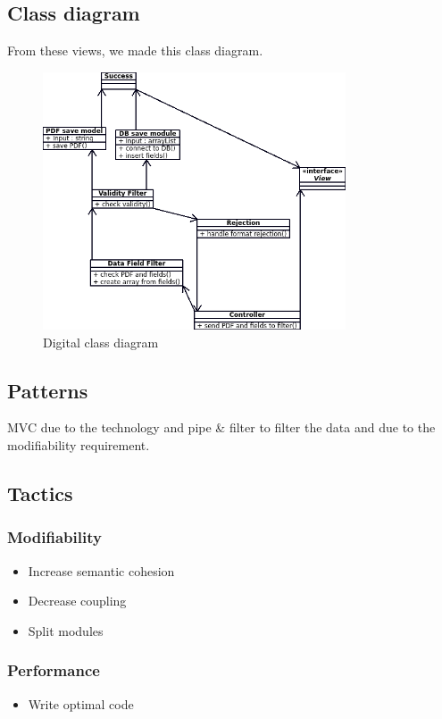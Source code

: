 \subsection{Class diagram}
From these views, we made this class diagram.
\begin{figure}[h]
\centering
\includegraphics[width=0.8\textwidth]{diagrams/class_diagram.png}
\caption{Digital class diagram}
\label{fig:class_diagram}
\end{figure}
\subsection{Patterns}
MVC due to the technology and pipe \&  filter to filter the data and due to the modifiability requirement.
\subsection{Tactics}
\subsubsection{Modifiability}
\begin{itemize}
\item Increase semantic cohesion
\item Decrease coupling
\item Split modules
\end{itemize}

\subsubsection{Performance}
\begin{itemize}
\item Write optimal code
\end{itemize}

